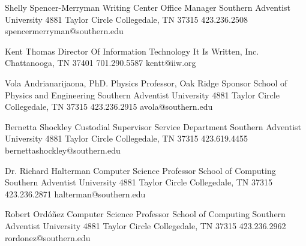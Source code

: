  
Shelly Spencer-Merryman
Writing Center Office Manager
Southern Adventist University
4881 Taylor Circle
Collegedale, TN 37315
423.236.2508
spencermerryman@southern.edu

Kent Thomas
Director Of Information Technology
It Is Written, Inc.
Chattanooga, TN 37401
701.290.5587
kentt@iiw.org

Vola Andrianarijaona, PhD.
Physics Professor, Oak Ridge Sponsor
School of Physics and Engineering
Southern Adventist University
4881 Taylor Circle
Collegedale, TN 37315
423.236.2915
avola@southern.edu

Bernetta Shockley
Custodial Supervisor
Service Department
Southern Adventist University
4881 Taylor Circle
Collegedale, TN 37315
423.619.4455
bernettashockley@southern.edu

Dr. Richard Halterman
Computer Science Professor
School of Computing
Southern Adventist University
4881 Taylor Circle
Collegedale, TN 37315
423.236.2871
halterman@southern.edu

Robert Ordóñez
Computer Science Professor
School of Computing
Southern Adventist University
4881 Taylor Circle
Collegedale, TN 37315
423.236.2962
rordonez@southern.edu
